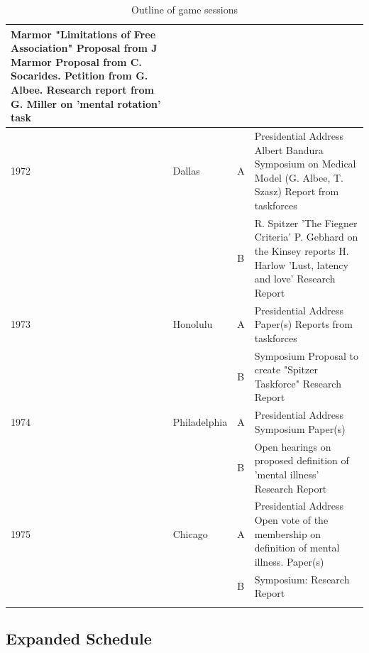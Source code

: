 \begin{longtable}[!t]{ | p{1cm} | p{2cm} | p{1cm} | p{10cm} | }
Marmor "Limitations of Free Association"\newline
Proposal from J Marmor\newline
Proposal from C. Socarides.\newline
Petition from G. Albee.\newline
Research report from G. Miller on 'mental rotation' task\\ \hline
1972&Dallas&A&Presidential Address\: Albert Bandura\newline
Symposium on Medical Model (G. Albee, T. Szasz)\newline
Report from taskforces\\
&&B&
R. Spitzer 'The Fiegner Criteria'\newline
P. Gebhard on the Kinsey reports\newline
H. Harlow 'Lust, latency and love'\newline
Research Report\\ \hline
1973&Honolulu&A&
Presidential Address\: \newline
Paper(s) \newline
Reports from taskforces\\
&&B&
Symposium\:\newline
Proposal to create "Spitzer Taskforce"\newline
Research Report\\ \hline
1974&Philadelphia&A
&Presidential Address\:\newline
Symposium\:\newline
Paper(s)\\
&&B&
Open hearings on proposed definition of 'mental illness'\newline
Research Report\\ \hline
1975&Chicago&A&
Presidential Address\:\newline
Open vote of the membership on definition of mental illness.\newline
Paper(s)\\
&&B&
Symposium:\newline
Research Report\\
\hline

\caption{Outline of game sessions}
\label{table: outlineGameSessions}
\end{longtable}

\subsection{Expanded Schedule}
\label{expandedschedule}

